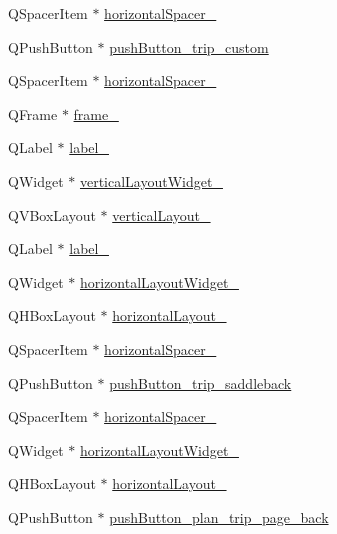 \begin{DoxyCompactItemize}
Q\+Spacer\+Item $\ast$ \hyperlink{class_ui___main_window_ab6496ca8cbff418ced70438d3c6f8b1b}{horizontal\+Spacer\+\_}
\item 
Q\+Push\+Button $\ast$ \hyperlink{class_ui___main_window_ae9aba0482f465f8db19ff2779a509ba4}{push\+Button\+\_\+trip\+\_\+custom}
\item 
Q\+Spacer\+Item $\ast$ \hyperlink{class_ui___main_window_a3817963f3405366f96b5778db81eaa78}{horizontal\+Spacer\+\_}
\item 
Q\+Frame $\ast$ \hyperlink{class_ui___main_window_a72626a4db2c0b7f87ecdbd8b79ab416a}{frame\+\_}
\item 
Q\+Label $\ast$ \hyperlink{class_ui___main_window_a78c7e10730b43c6700cd7216911ed76a}{label\+\_}
\item 
Q\+Widget $\ast$ \hyperlink{class_ui___main_window_acfaf6d66c957965550714c6b9bd0edc0}{vertical\+Layout\+Widget\+\_}
\item 
Q\+V\+Box\+Layout $\ast$ \hyperlink{class_ui___main_window_a0c01bad60d9f422a1258e710635a2f65}{vertical\+Layout\+\_}
\item 
Q\+Label $\ast$ \hyperlink{class_ui___main_window_aa2621565827195e88436fb54220bb48d}{label\+\_}
\item 
Q\+Widget $\ast$ \hyperlink{class_ui___main_window_ae68487982d7a29108678abaf0065094b}{horizontal\+Layout\+Widget\+\_}
\item 
Q\+H\+Box\+Layout $\ast$ \hyperlink{class_ui___main_window_ab48e49d68609b4c66e5169e2f87e3eb9}{horizontal\+Layout\+\_}
\item 
Q\+Spacer\+Item $\ast$ \hyperlink{class_ui___main_window_af0ccf7674274075e2495c3ad7a62f19b}{horizontal\+Spacer\+\_}
\item 
Q\+Push\+Button $\ast$ \hyperlink{class_ui___main_window_abf0351a75a6acb4a85cb3ab2f095cdcd}{push\+Button\+\_\+trip\+\_\+saddleback}
\item 
Q\+Spacer\+Item $\ast$ \hyperlink{class_ui___main_window_af8e48d5cfb827607dfd999c54ac86e73}{horizontal\+Spacer\+\_}
\item 
Q\+Widget $\ast$ \hyperlink{class_ui___main_window_a16b569f54bb780ef67e8695f26d7ea07}{horizontal\+Layout\+Widget\+\_}
\item 
Q\+H\+Box\+Layout $\ast$ \hyperlink{class_ui___main_window_ad07bcc9304056b61c4065a1e77ce0ba2}{horizontal\+Layout\+\_}
\item 
Q\+Push\+Button $\ast$ \hyperlink{class_ui___main_window_a133c68c85673a120d9589e3c7258ce0c}{push\+Button\+\_\+plan\+\_\+trip\+\_\+page\+\_\+back}

\end{DoxyCompactItemize}
